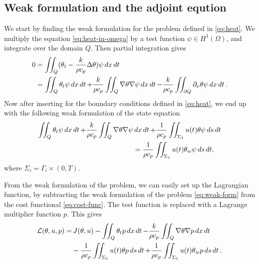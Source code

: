 
\subsection{Weak formulation and the adjoint eqution}

We start by finding the weak formulation for the problem defined in \eqref{eq:heat}. We multiply the equation \eqref{eq:heat-in-omega} by a test function $\psi\in H^1(\Omega)$, and integrate over the domain $Q$. Then partial integration gives
\begin{equation}
\begin{aligned}
  0 &= \iint_Q (\theta_t - \frac{k}{\rho c_p}\Delta\theta)\psi\mathop{dx}\mathop{dt}  \\
  &= \iint_Q \theta_t\psi\mathop{dx}\mathop{dt} + \frac{k}{\rho c_p}\iint_Q\nabla\theta\nabla\psi\mathop{dx}\mathop{dt} - \frac{k}{\rho c_p}\iint_{\partial Q}\partial_\nu\theta\psi\mathop{dx}\mathop{dt}.
\end{aligned}
\end{equation}
Now after inserting for the boundary conditions defined in \eqref{eq:heat}, we end up with the following weak formulation of the state equation
\begin{equation}
  \begin{aligned}\label{eq:weak-form}
  \iint_Q \theta_t\psi\mathop{dx}\mathop{dt} + \frac{k}{\rho c_p}\iint_Q\nabla\theta\nabla\psi &\mathop{dx}\mathop{dt} + \frac{1}{\rho c_p}\iint_{\Sigma_1} u(t)\theta\psi\mathop{ds}\mathop{dt} \\
  &= \frac{1}{\rho c_p}\iint_{\Sigma_1} u(t)\theta_w\psi\mathop{ds}\mathop{dt},
  \end{aligned}
\end{equation}
where $\Sigma_i = \Gamma_i\times(0,T)$.

From the weak formulation of the problem, we can easily set up the Lagrangian function, by subtracting the weak formulation of the problem \eqref{eq:weak-form} from the cost functional \eqref{eq:cost-func}. The test function is replaced with a Lagrange multiplier function $p$. This gives
\begin{equation}
  \begin{aligned}\label{eq:lagrangian-raw}
  \mathcal{L}(\theta, u, p) = &\,J(\theta, u) - \iint_Q \theta_t p\mathop{dx}\mathop{dt} - \frac{k}{\rho c_p}\iint_Q\nabla\theta\nabla p \mathop{dx}\mathop{dt} \\
  &- \frac{1}{\rho c_p}\iint_{\Sigma_1} u(t)\theta p\mathop{ds}\mathop{dt}
  + \frac{1}{\rho c_p}\iint_{\Sigma_1} u(t)\theta_w p\mathop{ds}\mathop{dt}.
  \end{aligned}
\end{equation}

